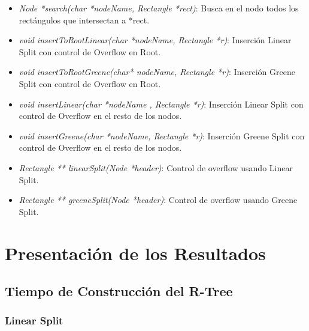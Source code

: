 \documentclass[letterpaper,10pt]{article}
\begin{document}
\begin{itemize}
		\item \textit{Node *search(char *nodeName, Rectangle *rect)}: Busca en el nodo todos los rectángulos que intersectan a *rect.
		\item \textit{void insertToRootLinear(char *nodeName, Rectangle *r)}: Inserción Linear Split con control de Overflow en Root.
		\item \textit{void insertToRootGreene(char* nodeName, Rectangle *r)}: Inserción Greene Split con control de Overflow en Root.
		\item \textit{void insertLinear(char *nodeName , Rectangle *r)}: Inserción Linear Split con control de Overflow en el resto de los nodos.
		\item \textit{void insertGreene(char *nodeName, Rectangle *r)}: Inserción Greene Split con control de Overflow en el resto de los nodos.
		\item \textit{Rectangle ** linearSplit(Node *header)}: Control de overflow usando Linear Split.
		\item \textit{Rectangle ** greeneSplit(Node *header)}: Control de overflow usando Greene Split.
	\end{itemize}

	\newpage

	\section{Presentación de los Resultados}

	\subsection{Tiempo de Construcción del R-Tree}
	\subsubsection{Linear Split}
\end{document}
